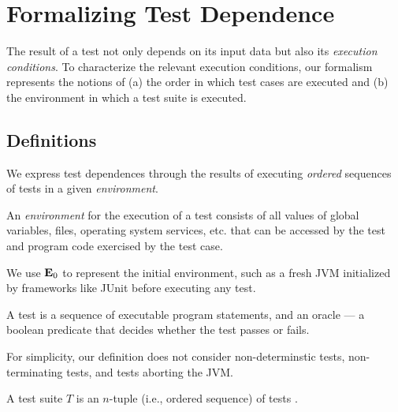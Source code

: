 
\section{Formalizing Test Dependence}
\label{sec:formalism}


The result of a test not only depends on
its input data but also its \emph{execution conditions}.
To characterize the relevant execution conditions, 
our formalism represents the notions of
(a) the order in which test cases are executed and (b) the environment in which a test suite is executed.  


\subsection{Definitions}
\label{sec:definitions}

We express test dependences through the results of executing
\emph{ordered} sequences of tests in a given \emph{environment}.


\begin{definition}[Environment]
An \emph{environment} \env for the execution of a test
consists of all values of global variables, files,
operating
system services, etc. that
can be accessed by the test and program code exercised by the test
case.
\end{definition}

We use $\mathbf{E}_0$ to represent the initial environment, such
as a fresh JVM initialized by frameworks like JUnit
before executing any test.


\begin{definition}[Test]

A test is a sequence of executable program statements, and an oracle
--- a boolean predicate that
decides whether the test passes or fails.
\end{definition}

For simplicity, our definition does not consider non-determinstic
tests, non-terminating tests, and tests aborting the JVM.


\begin{definition}
A test suite\/ $T$ is an $n$-tuple (i.e., ordered sequence) of tests
.

\end{definition}


